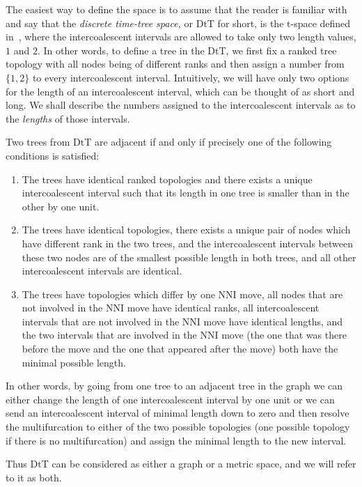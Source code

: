 \documentclass{amsart}
\newcommand{\dts}{\mathrm{DtT}}
\begin{document}
The easiest way to define the space is to assume that the reader is familiar
with~\cite{Gavryushkin2014-bw} and say that the
{\em discrete time-tree space,}
or $\dts$ for short, is the $\mathrm t$-space defined
in~\cite{Gavryushkin2014-bw}, where the intercoalescent intervals are allowed to take only two length values, $1$ and $2$.
In other words, to define a tree in the $\dts$, we first fix a ranked tree
topology with all nodes being of different ranks and then assign a number
from $\{1,2\}$ to every intercoalescent interval.
Intuitively, we will have
only two options for the length of an intercoalescent interval, which can
be thought of as short and long.
We shall describe the numbers assigned to the intercoalescent intervals as to the {\em lengths} of those intervals.

Two trees from $\dts$ are adjacent if and only if precisely one of the following
conditions is satisfied:

\begin{enumerate}[(1)]
\item The trees have identical ranked topologies and there exists a unique
intercoalescent interval such that its length in one tree is smaller than in the
other by one unit.
\item The trees have identical topologies, there exists a unique pair of nodes
which have different rank in the two trees, and the intercoalescent intervals
between these two nodes are of the smallest possible length in both trees, and all other intercoalescent intervals are identical.
\item The trees have topologies which differ by one NNI move, all nodes that
are not involved in the NNI move have identical ranks, all intercoalescent
intervals that are not involved in the NNI move have identical lengths,
and the two intervals that are involved in the NNI move (the one that was there
before the move and the one that appeared after the move) both have the minimal
possible length.
\end{enumerate}

In other words, by going from one tree to an adjacent tree in the graph we can
either change the length of one intercoalescent interval by one unit or we
can send an intercoalescent interval of minimal length down to zero and
then resolve the multifurcation to either of the two possible topologies
(one possible topology if there is no multifurcation) and
assign the minimal length to the new interval.

Thus $\dts$ can be considered as either a graph or a metric space, and we will refer to it as both.
\end{document}
